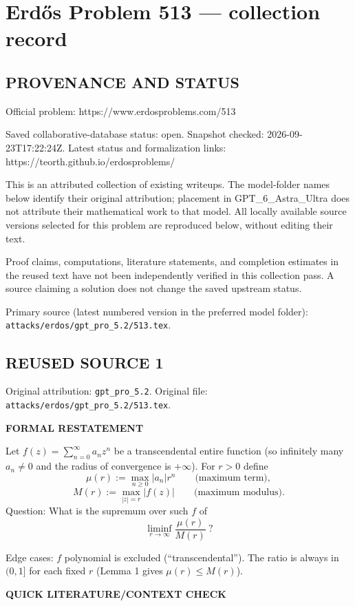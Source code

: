 \section*{Erd\H{o}s Problem 513 --- collection record}

\subsection*{PROVENANCE AND STATUS}
Official problem: https://www.erdosproblems.com/513

Saved collaborative-database status: open.
Snapshot checked: 2026-09-23T17:22:24Z.
Latest status and formalization links: https://teorth.github.io/erdosproblems/

This is an attributed collection of existing writeups. The model-folder names below identify their original attribution; placement in GPT\_6\_Astra\_Ultra does not attribute their mathematical work to that model. All locally available source versions selected for this problem are reproduced below, without editing their text.

Proof claims, computations, literature statements, and completion estimates in the reused text have not been independently verified in this collection pass. A source claiming a solution does not change the saved upstream status.

Primary source (latest numbered version in the preferred model folder): \texttt{attacks/erdos/gpt\_pro\_5.2/513.tex}.

\subsection*{REUSED SOURCE 1}
Original attribution: \texttt{gpt\_pro\_5.2}.
Original file: \texttt{attacks/erdos/gpt\_pro\_5.2/513.tex}.

\noindent\textbf{FORMAL RESTATEMENT}

Let $f(z)=\sum_{n=0}^{\infty} a_n z^n$ be a transcendental entire function (so infinitely many $a_n\neq 0$ and the radius of convergence is $+\infty$). For $r>0$ define
\[
\mu(r):=\max_{n\ge 0} |a_n| r^n\qquad\text{(maximum term)},
\]
\[
M(r):=\max_{|z|=r} |f(z)|\qquad\text{(maximum modulus)}.
\]
Question: What is the supremum over such $f$ of
\[
\liminf_{r\to\infty} \frac{\mu(r)}{M(r)}\ ?
\]

Edge cases: $f$ polynomial is excluded (``transcendental''). The ratio is always in $(0,1]$ for each fixed $r$ (Lemma 1 gives $\mu(r)\le M(r)$).

\medskip
\noindent\textbf{QUICK LITERATURE/CONTEXT CHECK}

